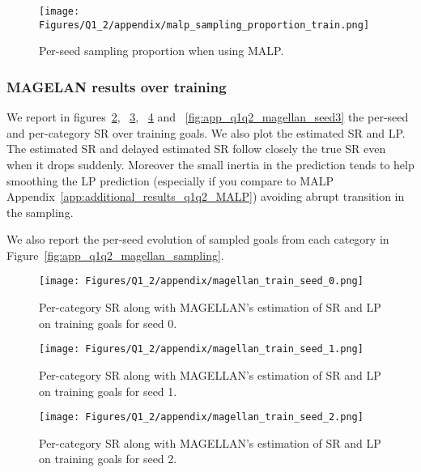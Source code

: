 \begin{figure}[!ht]
    \centering
    \texttt{[image: Figures/Q1\_2/appendix/malp\_sampling\_proportion\_train.png]}
    \caption{Per-seed sampling proportion when using MALP.}
    \label{fig:app_q1q2_malp_sampling}
\end{figure}

\subsubsection{MAGELAN results over training}
\label{app:additional_results_q1q2_MAGELLAN}
We report in figures~\ref{fig:app_q1q2_magellan_seed0}, ~\ref{fig:app_q1q2_magellan_seed1}, ~\ref{fig:app_q1q2_magellan_seed2} and ~\ref{fig:app_q1q2_magellan_seed3} the per-seed and per-category SR over training goals. We also plot the estimated SR and LP. The estimated SR and delayed estimated SR follow closely the true SR even when it drops suddenly. Moreover the small inertia in the prediction tends to help smoothing the LP prediction (especially if you compare to MALP Appendix~\ref{app:additional_results_q1q2_MALP}) avoiding abrupt transition in the sampling.

We also report the per-seed evolution of sampled goals from each category in Figure~\ref{fig:app_q1q2_magellan_sampling}.

\begin{figure}[!ht]
    \centering
    \texttt{[image: Figures/Q1\_2/appendix/magellan\_train\_seed\_0.png]}
    \caption{Per-category SR along with MAGELLAN's estimation of SR and LP on training goals for seed 0.}
    \label{fig:app_q1q2_magellan_seed0}
\end{figure}

\begin{figure}[!ht]
    \centering
    \texttt{[image: Figures/Q1\_2/appendix/magellan\_train\_seed\_1.png]}
    \caption{Per-category SR along with MAGELLAN's estimation of SR and LP on training goals for seed 1.}
    \label{fig:app_q1q2_magellan_seed1}
\end{figure}

\begin{figure}[!ht]
    \centering
    \texttt{[image: Figures/Q1\_2/appendix/magellan\_train\_seed\_2.png]}
    \caption{Per-category SR along with MAGELLAN's estimation of SR and LP on training goals for seed 2.}
    \label{fig:app_q1q2_magellan_seed2}
\end{figure}

